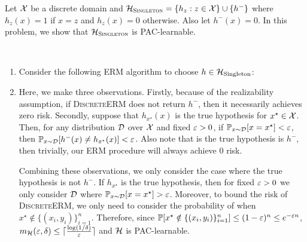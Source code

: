 \begin{problem}{2}
    Let $\mathcal{X}$ be a discrete domain and $\mathcal{H}_\textsc{Singleton} = \{h_z : z \in \mathcal{X}\} \cup \{h^-\}$ where $h_z(x) = 1$ if $x = z$ and $h_z(x) = 0$ otherwise. Also let $h^-(x) = 0$. In this problem, we show that $\mathcal{H}_\textsc{Singleton}$ is PAC-learnable.
\end{problem}
\begin{solution} \
    \begin{enumerate}[label=(\alph*)]
        \item Consider the following ERM algorithm to choose $h \in \mathcal{H}_{\textrm{Singleton}}$:
        \begin{center}
        \end{center}
        \item Here, we make three observations. Firstly, because of the realizability assumption, if \textsc{DiscreteERM} does not return $h^-$, then it necessarily achieves zero risk. Secondly, suppose that $h_{x^\star}(x)$ is the true hypothesis for $x^\star\in \mathcal{X}$. Then, for any distribution $\mathcal{D}$ over $\mathcal{X}$ and fixed $\varepsilon > 0$, if $\mathbb{P}_{x \sim \mathcal{D}}[x = x^\star] < \varepsilon$, then $\mathbb{P}_{x\sim \mathcal{D}}[h^-(x) \neq h_{x^\star}(x)] < \varepsilon$. Also note that is the true hypothesis is $h^-$, then trivially, our ERM procedure will always achieve 0 risk. 

        Combining these observations, we only consider the case where the true hypothesis is not $h^-$. If $h_{x^\star}$ is the true hypothesis, then for fixed $\varepsilon > 0$ we only consider $\mathcal{D}$ where $\mathbb{P}_{x \sim \mathcal{D}}[x = x^\star] > \varepsilon$. Moreover, to bound the risk of \textsc{DiscreteERM}, we only need to consider the probability of when $x^\star \notin \{(x_i, y_i)\}_{i=1}^n$. Therefore, since $\mathbb{P}[x^\star \notin \{(x_i, y_i)\}_{i=1}^n] \leq (1-\varepsilon)^n \leq e^{-\varepsilon n}$, $m_{\mathcal{H}}(\varepsilon, \delta) \leq \lceil\frac{\log(1/\delta)}{\varepsilon}\rceil$ and $\mathcal{H}$ is PAC-learnable.  
    \end{enumerate}
\end{solution}


